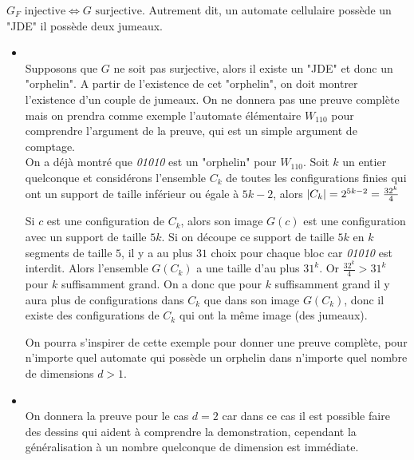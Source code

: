 \begin{theorem}
	$G_F \text{ injective} \iff G \text{ surjective}$. Autrement dit, un automate cellulaire possède un "JDE" \ssi il possède deux jumeaux.
\end{theorem}



\begin{proofI}
	\begin{itemize}
		\item \bimpLR\\
		      Supposons que $G$ ne soit pas surjective, alors il existe un "JDE" et donc un "orphelin".
		      A partir de l'existence de cet "orphelin", on doit montrer l'existence d'un couple de jumeaux.
		      On ne donnera pas une preuve complète mais on prendra comme exemple l'automate élémentaire $W_{110}$ pour
		      comprendre l'argument de la preuve, qui est un simple argument de comptage.\\
		      On a déjà montré que \emph{01010} est un "orphelin" pour $W_{110}$. Soit $k$ un entier quelconque
		      et considérons  l'ensemble $C_k$ de toutes les configurations finies qui ont un support de taille
		      inférieur ou égale à $5k-2$, alors $\left|C_k\right| = 2^{5k-2} = \frac {32^k} 4$

		      Si $c$ est une configuration de $C_k$, alors son image $G(c)$ est une configuration avec un support de taille $5k$.
		      Si on découpe ce support de taille $5k$ en $k$ segments de taille $5$, il y a au plus $31$ choix pour chaque bloc car
		      \emph{01010} est interdit. Alors l'ensemble $G(C_k)$ a une taille d'au plus $31^k$.
		      Or $\frac {32^k} 4 > 31 ^ k$ pour  $k$ suffisamment grand. On a donc que pour $k$ suffisamment grand
		      il y aura plus de configurations
		      dans $C_k$ que dans son image $G(C_k)$, donc il existe des configurations de
		      $C_k$ qui ont la même image (des jumeaux).


		      On pourra s'inspirer de cette exemple pour donner une preuve complète, pour n'importe quel automate qui possède un
		      orphelin dans n'importe
		      quel nombre de dimensions $d > 1$.


		\item \bimpRL\\
		      On donnera la preuve pour le cas $d=2$ car dans ce cas il est possible faire des dessins qui aident à
		      comprendre la demonstration, cependant la généralisation à un nombre quelconque de dimension est immédiate.


\end{itemize}
\end{proofI}

